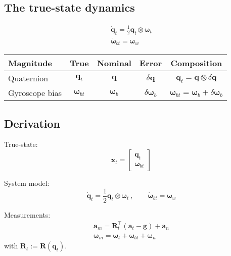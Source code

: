 \documentclass[11pt,a4paper]{scrartcl}
\renewcommand\vec{\bm}
\newcommand{\quat}[1]{\mathbf{#1}}
\newcommand{\Matrix}[1]{\mathbf{#1}}
\newcommand{\qprod}{\otimes}
\begin{document}
\subsection{The true-state dynamics}

\begin{subequations}
\begin{eqnarray}
	\dot{\quat{q}}_t = \frac{1}{2} \quat{q}_t \qprod \vec{\omega}_t \\
	\dot{\vec{\omega}}_{bt} = \vec{\omega}_w
\end{eqnarray}
\end{subequations}

\begin{tabular}{l c c c c}
	Magnitude & True & Nominal & Error & Composition \\ \hline
	Quaternion & $\quat{q}_t$ & $\quat{q}$ & $\delta \quat{q}$ & $\quat{q}_t = \quat{q} \qprod \delta \quat{q}$ \\
	Gyroscope bias & $\vec{\omega}_{bt}$ & $\vec{\omega}_b$ & $\delta \vec{\omega}_b$ & $\vec{\omega}_{bt} = \vec{\omega}_b + \delta \vec{\omega}_b$
\end{tabular}

\subsection{Derivation}

True-state:
\begin{equation}
	\vec{x}_t
	=
	\begin{bmatrix}
		\quat{q}_t \\ \vec{\omega}_{bt}
	\end{bmatrix}
\end{equation}

System model:
\begin{equation}
	\dot{\quat{q}}_t = \frac{1}{2} \quat{q}_t \qprod \vec{\omega}_t \medspace,
	\qquad
	\dot{\vec{\omega}}_{bt} = \vec{\omega}_w
\end{equation}

Measurements:
\begin{subequations}
\begin{eqnarray}
	\vec{a}_m = \Matrix{R}_t^\intercal \left( \vec{a}_t - \vec{g} \right) + \vec{a}_n \\
	\vec{\omega}_m = \vec{\omega}_t + \vec{\omega}_{bt} + \vec{\omega}_n
\end{eqnarray}
\end{subequations}
with $\Matrix{R}_t := \Matrix{R}(\quat{q}_t)$.
\end{document}
